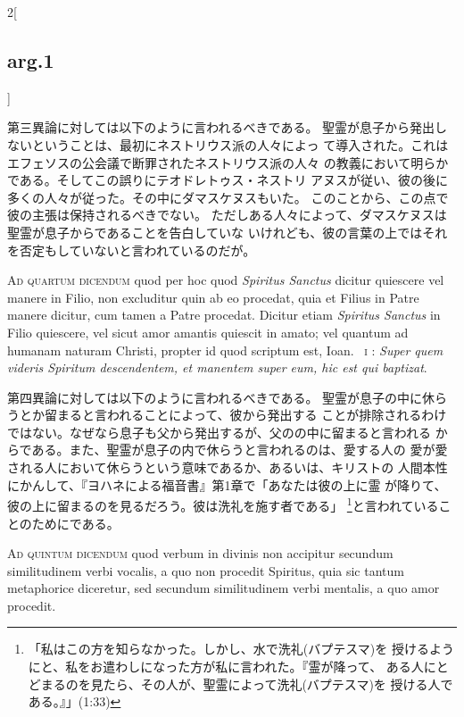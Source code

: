 \documentclass[paper=a4paper,fontsize=10pt,jafontsize=9pt,titlepage]{jlreq}
\begin{document}
\begin{paracol}{2}[\subsection{arg.1}]
\switchcolumn

第三異論に対しては以下のように言われるべきである。
聖霊が息子から発出しないということは、最初にネストリウス派の人々によっ
 て導入された。これはエフェソスの公会議で断罪されたネストリウス派の人々
 の教義において明らかである。そしてこの誤りにテオドレトゥス・ネストリ
 アヌスが従い、彼の後に多くの人々が従った。その中にダマスケヌスもいた。
 このことから、この点で彼の主張は保持されるべきでない。
ただしある人々によって、ダマスケヌスは聖霊が息子からであることを告白していな
いけれども、彼の言葉の上ではそれを否定もしていないと言われているのだが。

\switchcolumn*[\subsection{ad.4}]

{\scshape Ad quartum dicendum} quod per hoc quod {\itshape  Spiritus Sanctus}
dicitur quiescere vel manere in Filio, non excluditur quin ab eo
procedat, quia et Filius in Patre manere dicitur, cum tamen a Patre
procedat. Dicitur etiam {\itshape  Spiritus Sanctus} in Filio
quiescere, vel sicut amor amantis quiescit in amato; vel quantum ad
humanam naturam Christi, propter id quod scriptum est, Ioan.~{\scshape
 i} : {\itshape Super
quem videris  Spiritum descendentem, et manentem super eum, hic est qui
baptizat}.

\switchcolumn

第四異論に対しては以下のように言われるべきである。
聖霊が息子の中に休らうとか留まると言われることによって、彼から発出する
 ことが排除されるわけではない。なぜなら息子も父から発出するが、父のの中に留まると言われる
 からである。また、聖霊が息子の内で休らうと言われるのは、愛する人の
 愛が愛される人において休らうという意味であるか、あるいは、キリストの
 人間本性にかんして、『ヨハネによる福音書』第1章で「あなたは彼の上に霊
 が降りて、彼の上に留まるのを見るだろう。彼は洗礼を施す者である」
 \footnote{「私はこの方を知らなかった。しかし、水で洗礼(バプテスマ)を
 授けるようにと、私をお遣わしになった方が私に言われた。『霊が降って、
 ある人にとどまるのを見たら、その人が、聖霊によって洗礼(バプテスマ)を
 授ける人である。』」(1:33)}と言われていることのためにである。

\switchcolumn*[\subsection{ad.5}]

{\scshape Ad quintum dicendum} quod verbum in divinis non accipitur secundum
similitudinem verbi vocalis, a quo non procedit  Spiritus, quia sic
tantum metaphorice diceretur, sed secundum similitudinem verbi
mentalis, a quo amor procedit.


\end{paracol}
\end{document}
